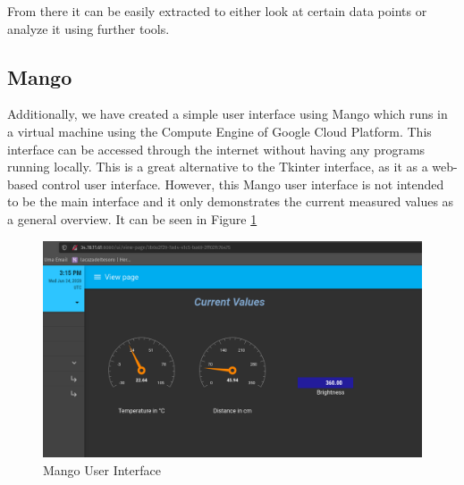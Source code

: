 \documentclass{article}
\begin{document}
From there it can be easily extracted to either look at certain data points or analyze it using further tools.
\subsection{Mango}
Additionally, we have created a simple user interface using Mango which runs in a virtual machine using the Compute Engine of Google Cloud Platform. This interface can be accessed through the internet without having any programs running locally. This is a great alternative to the Tkinter interface, as it as a web-based control user interface. However, this Mango user interface is not intended to be the main interface and it only demonstrates the current measured values as a general overview. It can be seen in Figure \ref{fig:mango}
\begin{figure}
\centering
\includegraphics[scale=0.35]{mango.png}
\caption{Mango User Interface}
\label{fig:mango}
\end{figure}
\end{document}
